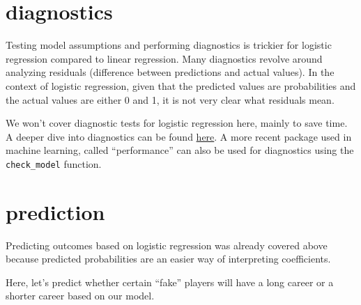 \documentclass[
]{book}
\newenvironment{Shaded}{\begin{snugshade}}{\end{snugshade}}
\newcommand{\AttributeTok}[1]{\textcolor[rgb]{0.13,0.29,0.53}{#1}}
\newcommand{\CommentTok}[1]{\textcolor[rgb]{0.56,0.35,0.01}{\textit{#1}}}
\newcommand{\FloatTok}[1]{\textcolor[rgb]{0.00,0.00,0.81}{#1}}
\newcommand{\FunctionTok}[1]{\textcolor[rgb]{0.13,0.29,0.53}{\textbf{#1}}}
\newcommand{\NormalTok}[1]{#1}
\newcommand{\OtherTok}[1]{\textcolor[rgb]{0.56,0.35,0.01}{#1}}
\newcommand{\SpecialCharTok}[1]{\textcolor[rgb]{0.81,0.36,0.00}{\textbf{#1}}}
\newcommand{\StringTok}[1]{\textcolor[rgb]{0.31,0.60,0.02}{#1}}
\begin{document}
\hypertarget{diagnostics}{%
\section{diagnostics}\label{diagnostics}}

Testing model assumptions and performing diagnostics is trickier for logistic regression compared to linear regression. Many diagnostics revolve around analyzing residuals (difference between predictions and actual values). In the context of logistic regression, given that the predicted values are probabilities and the actual values are either 0 and 1, it is not very clear what residuals mean.

We won't cover diagnostic tests for logistic regression here, mainly to save time. A deeper dive into diagnostics can be found \href{http://www.sthda.com/english/articles/36-classification-methods-essentials/148-logistic-regression-assumptions-and-diagnostics-in-r/}{here}. A more recent package used in machine learning, called ``performance'' can also be used for diagnostics using the \texttt{check\_model} function.

\hypertarget{prediction}{%
\section{prediction}\label{prediction}}

Predicting outcomes based on logistic regression was already covered above because predicted probabilities are an easier way of interpreting coefficients.

Here, let's predict whether certain ``fake'' players
will have a long career or a shorter career based on our model.

\begin{Shaded}
\end{Shaded}
\end{document}
